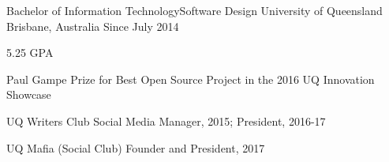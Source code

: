 


\begin{cventries}


\cventry
{Bachelor of Information Technology{\enskip\cdotp\enskip}Software Design} %
{University of Queensland} %
{Brisbane, Australia} %
{Since July 2014} %
{ %
\begin{cvitems}
\item 5.25 GPA
\item {Paul Gampe Prize for Best Open Source Project in the 2016 UQ Innovation Showcase}
\item {UQ Writers Club Social Media Manager, 2015; President, 2016-17}
\item {UQ Mafia (Social Club) Founder and President, 2017}
\end{cvitems}
}


\end{cventries}